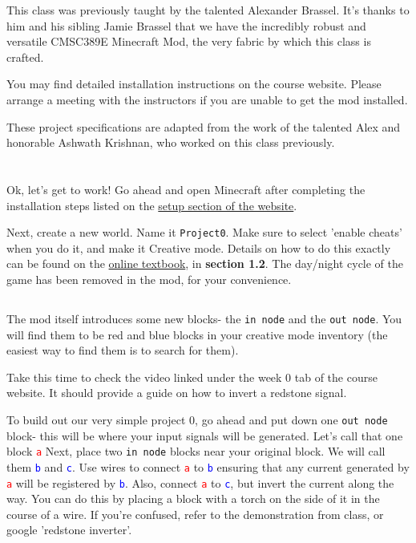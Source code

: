 \documentclass{article}
\begin{document}
This class was previously taught by the talented Alexander Brassel. It's thanks to him and his sibling Jamie Brassel that we have the incredibly robust and versatile CMSC389E Minecraft Mod, the very fabric by which this class is crafted. 

You may find detailed installation instructions on the course website. Please arrange a meeting with the instructors if you are unable to get the mod installed.

These project specifications are adapted from the work of the talented Alex and honorable Ashwath Krishnan, who worked on this class previously.

\section{\selectfont{The First Project!}}

Ok, let's get to work! Go ahead and open Minecraft after completing the installation steps listed on the \href{https://cmsc-389e.github.io/setup.html}{setup section of the website}.

Next, create a new world. Name it \texttt{Project0}. Make sure to select 'enable cheats' when you do it, and make it Creative mode. Details on how to do this exactly can be found on the \href{https://cmsc-389e.github.io/digital-logic-computer-architecture-minecraft/index.html}{online textbook}, in \textbf{section 1.2}. The day/night cycle of the game has been removed in the mod, for your convenience.

\subsection{\selectfont{New Blocks}}

The mod itself introduces some new blocks- the \texttt{in node} and the \texttt{out node}. You will find them to be red and blue blocks in your creative mode inventory (the easiest way to find them is to search for them).

Take this time to check the video linked under the week 0 tab of the course website. It should provide a guide on how to invert a redstone signal.

To build out our very simple project 0, go ahead and put down one \texttt{out node} block- this will be where your input signals will be generated. Let's call that one block \textcolor{red}{\texttt{a}} Next, place two \texttt{in node} blocks near your original block. We will call them \textcolor{blue}{\texttt{b}} and \textcolor{blue}{\texttt{c}}. Use wires to connect \textcolor{red}{\texttt{a}} to \textcolor{blue}{\texttt{b}} ensuring that any current generated by \textcolor{red}{\texttt{a}} will be registered by \textcolor{blue}{\texttt{b}}. Also, connect \textcolor{red}{\texttt{a}} to \textcolor{blue}{\texttt{c}}, but invert the current along the way. You can do this by placing a block with a torch on the side of it in the course of a wire. If you're confused, refer to the demonstration from class, or google 'redstone inverter'. 
        
\end{document}
